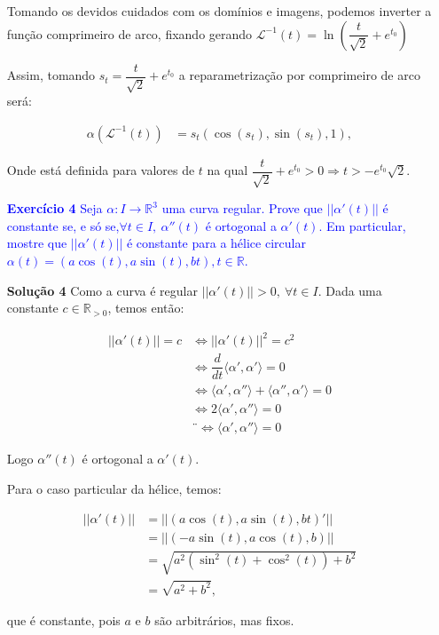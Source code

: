\documentclass[12pt,letterpaper]{article}
\newcommand\lcur{\mathcal{L}}
\newcommand{\real}{\mathbb{R}}
\newcommand{\rpos}{\mathbb{R}_{>0}}
\newcommand{\ex}[1]{\textcolor{blue}{\textbf{Exercício #1}}}
\newcommand{\sol}[1]{\textbf{Solução #1}}
\begin{document}
\begin{enumerate}
		Tomando os devidos cuidados com os domínios e imagens, podemos inverter a função comprimeiro de arco, fixando  gerando $\lcur^{-1}(t)=\ln\left(\dfrac{t}{\sqrt2}+e^{t_0}\right)$
		
		Assim, tomando $s_t=\dfrac{t}{\sqrt2}+e^{t_0}$ a reparametrização por comprimeiro de arco será:
		
		\begin{align*}
			\alpha(\lcur^{-1}(t))&=s_t\left(\cos\left(s_t\right),\sin\left(s_t\right),1\right),
		\end{align*}
	
	Onde está definida para valores de $t$ na qual $\dfrac{t}{\sqrt2}+e^{t_0}>0\Rightarrow t>-e^{t_0}\sqrt2$.
	
	\item[\ex{4}]\textcolor{blue}{Seja $\alpha:I\to\real^3$ uma curva regular. Prove que $||\alpha'(t)||$ é constante se, e só se,$\forall t \in I, ~\alpha''(t)$ é ortogonal a $\alpha'(t)$. Em particular, mostre que $||\alpha'(t)||$ é constante para a hélice circular $\alpha(t) = (a\cos(t),a\sin(t),bt),t\in\real$.}
	
	\item[\sol{4}] Como a curva é regular $||\alpha'(t)||>0, ~\forall t\in I$. Dada uma constante $c\in\rpos$, temos então:
	
	\begin{align*}
		||\alpha'(t)||=c&\Leftrightarrow||\alpha'(t)||^2=c^2\\
		&\Leftrightarrow \dfrac{d}{dt}\langle\alpha',\alpha'\rangle=0\\
		&\Leftrightarrow\langle\alpha',\alpha''\rangle+\langle\alpha'',\alpha'\rangle=0\\
		&\Leftrightarrow2\langle\alpha',\alpha''\rangle=0\\
		&¨\Leftrightarrow\langle\alpha',\alpha''\rangle=0
	\end{align*}

	Logo $\alpha''(t)$ é ortogonal a $\alpha'(t)$.
	
	Para o caso particular da hélice, temos:
	
	\begin{align*}
		||\alpha'(t)||&=||(a\cos(t),a\sin(t),bt)'||\\
		&=||(-a\sin(t),a\cos(t),b)||\\
		&=\sqrt{a^2(\sin^2(t)+\cos^2(t))+b^2}\\
		&=\sqrt{a^2+b^2},
	\end{align*}
	
	que é constante, pois $a$ e $b$ são arbitrários, mas fixos.
	

\end{enumerate}
\end{document}
